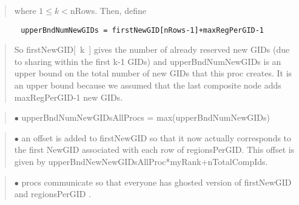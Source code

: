 \documentclass[11pt]{article}
\begin{document}
\vspace{-.2in}
\begin{quote}
where $ 1 \le k < ${\sf nRows}. Then, define
\end{quote}
\vspace{-.2in}
\begin{verbatim}
       upperBndNumNewGIDs = firstNewGID[nRows-1]+maxRegPerGID-1
\end{verbatim}
\vspace{-.2in}
\begin{quote}
So {\sf firstNewGID[~k~]} gives the number of already reserved new GIDs
     (due to sharing within the first k-1 GIDs) and {\sf upperBndNumNewGIDs}
     is an upper bound on the total number of new GIDs that this proc creates.
     It is an upper bound because we assumed that the last composite node
     adds maxRegPerGID-1 new GIDs.
\end{quote}
\vspace{-.2in}
\begin{quote}
$\bullet$ {\sf upperBndNumNewGIDsAllProcs = max(upperBndNumNewGIDs)}
\end{quote}
\vspace{-.2in}
\begin{quote}
$\bullet$ an offset is added to {\sf firstNewGID} so that it now actually
corresponds to the first NewGID associated with each row of {\sf regionsPerGID}.
This offset is given by {\sf upperBndNewNewGIDsAllProc*myRank+nTotalCompIds}.
\end{quote}
\vspace{-.2in}
\begin{quote}
$\bullet$ procs communicate so that everyone has
ghosted version of {\sf firstNewGID} and {\sf regionsPerGID} .
\end{quote}
\vspace{-.2in}
\end{document}
